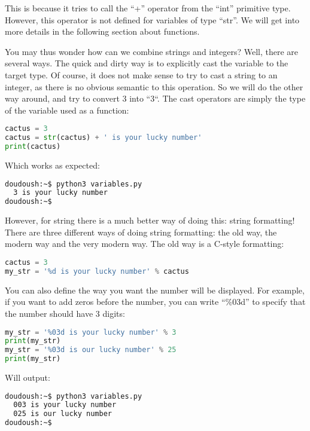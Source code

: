 This is because it tries to call the ``+'' operator from the ``int'' primitive type.
However, this operator is not defined for variables of type ``str''. We will get
into more details in the following section about functions.

\vspace{5mm}

You may thus wonder how can we combine strings and integers? Well, there are
several ways. The quick and dirty way is to explicitly cast the variable to
the target type. Of course, it does not make sense to try to cast a string to
an integer, as there is no obvious semantic to this operation. So we will do
the other way around, and try to convert 3 into ``3``. The cast operators are simply
the type of the variable used as a function:

\begin{lstlisting}[language=python]
cactus = 3
cactus = str(cactus) + ' is your lucky number'
print(cactus)
\end{lstlisting}

Which works as expected:

\begin{lstlisting}[language=bash]
doudoush:~$ python3 variables.py
  3 is your lucky number
doudoush:~$
\end{lstlisting}

However, for string there is a much better way of doing this: string formatting!
There are three different ways of doing string formatting: the old way, the modern way
and the very modern way. The old way is a C-style formatting:

\begin{lstlisting}[language=python]
cactus = 3
my_str = '%d is your lucky number' % cactus
\end{lstlisting}

You can also define the way you want the number will be displayed. For example, if you
want to add zeros before the number, you can write ``\%03d'' to specify that
the number should have 3 digits:

\begin{lstlisting}[language=python]
my_str = '%03d is your lucky number' % 3
print(my_str)
my_str = '%03d is our lucky number' % 25
print(my_str)
\end{lstlisting}

Will output:
\begin{lstlisting}[language=bash]
doudoush:~$ python3 variables.py
  003 is your lucky number
  025 is our lucky number
doudoush:~$
\end{lstlisting}


